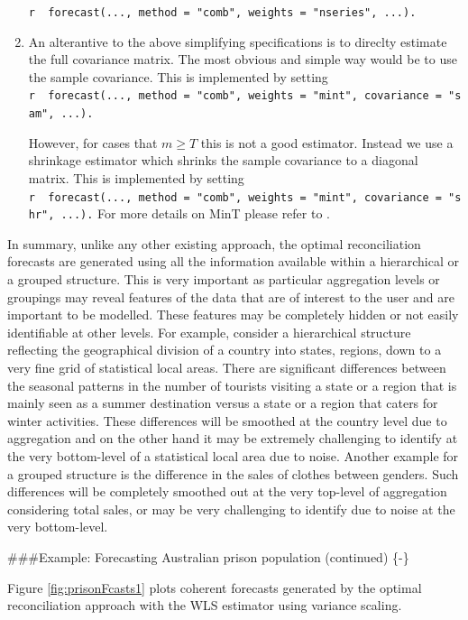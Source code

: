\documentclass[]{book}
\begin{document}
\begin{enumerate}
  \texttt{r\ \ forecast(...,\ method\ =\ "comb",\ weights\ =\ "nseries",\ ...).}
\item
  An alterantive to the above simplifying specifications is to direclty estimate the full covariance matrix. The most obvious and simple way would be to use the sample covariance. This is implemented by setting
  \texttt{r\ \ forecast(...,\ method\ =\ "comb",\ weights\ =\ "mint",\ covariance\ =\ "sam",\ ...).}

  However, for cases that \(m \ge T\) this is not a good estimator. Instead we use a shrinkage estimator which shrinks the sample covariance to a diagonal matrix. This is implemented by setting
  \texttt{r\ \ forecast(...,\ method\ =\ "comb",\ weights\ =\ "mint",\ covariance\ =\ "shr",\ ...).}
  For more details on MinT please refer to \citet{Mint}.
\end{enumerate}

In summary, unlike any other existing approach, the optimal reconciliation forecasts are generated using all the information available within a hierarchical or a grouped structure. This is very important as particular aggregation levels or groupings may reveal features of the data that are of interest to the user and are important to be modelled. These features may be completely hidden or not easily identifiable at other levels. For example, consider a hierarchical structure reflecting the geographical division of a country into states, regions, down to a very fine grid of statistical local areas. There are significant differences between the seasonal patterns in the number of tourists visiting a state or a region that is mainly seen as a summer destination versus a state or a region that caters for winter activities. These differences will be smoothed at the country level due to aggregation and on the other hand it may be extremely challenging to identify at the very bottom-level of a statistical local area due to noise. Another example for a grouped structure is the difference in the sales of clothes between genders. Such differences will be completely smoothed out at the very top-level of aggregation considering total sales, or may be very challenging to identify due to noise at the very bottom-level.

\#\#\#Example: Forecasting Australian prison population (continued) \{-\}

Figure \ref{fig:prisonFcasts1} plots coherent forecasts generated by the optimal reconciliation approach with the WLS estimator using variance scaling.
\end{document}

